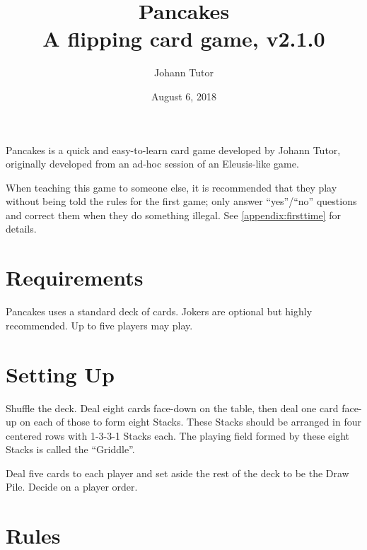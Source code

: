 \documentclass{article}
\newcommand\theversion{2.1.0}
\begin{document}
\title{Pancakes\\ \large A flipping card game, v\theversion}
\author{Johann Tutor}
\date{August 6, 2018}
\maketitle


Pancakes is a quick and easy-to-learn card game developed by Johann Tutor, originally developed from an ad-hoc session of an Eleusis-like game.

When teaching this game to someone else, it is recommended that they play without being told the rules for the first game;
only answer ``yes''/``no'' questions and correct them when they do something illegal. See \autoref{appendix:firsttime} for details.

\tableofcontents

\newpage

\section{Requirements \label{sec:requirements}}

Pancakes uses a standard deck of cards. Jokers are optional but highly recommended.
Up to five players may play.

\section{Setting Up \label{sec:setup}}

Shuffle the deck. Deal eight cards face-down on the table, then deal one card face-up on each of those to form eight Stacks.
These Stacks should be arranged in four centered rows with 1-3-3-1 Stacks each.
The playing field formed by these eight Stacks is called the ``Griddle''.

Deal five cards to each player and set aside the rest of the deck to be the Draw Pile. Decide on a player order.

\section{Rules \label{sec:rules}}
\end{document}
